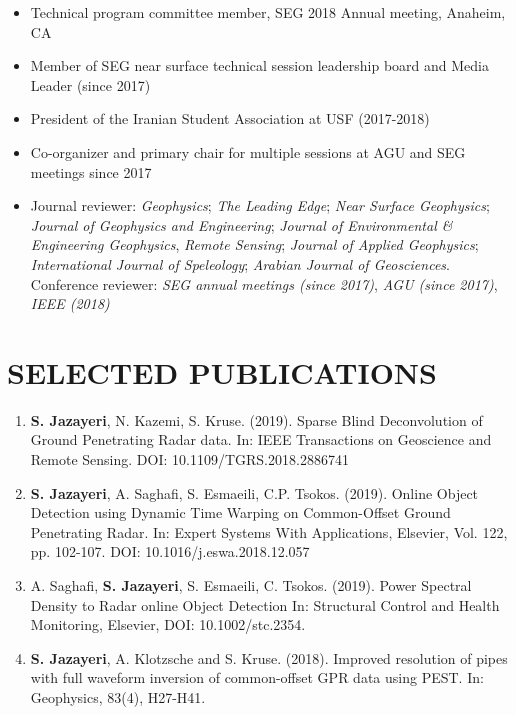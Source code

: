 \documentclass[11pt,a4paper,roman]{moderncv}        %
\begin{document}
{{{{{\begin{itemize}
	\item Technical program committee member, SEG 2018 Annual meeting, Anaheim, CA
	\item Member of SEG near surface technical session leadership board and Media Leader (since 2017) 
	\item President of the Iranian Student Association at USF (2017-2018)
	\item Co-organizer and primary chair for multiple sessions at AGU and SEG meetings since 2017
	\item Journal reviewer: \textit{Geophysics}; \textit{The Leading Edge}; \textit{Near Surface Geophysics}; \textit{Journal of Geophysics and Engineering}; \textit{Journal of Environmental \& Engineering Geophysics}, \textit{Remote Sensing}; \textit{Journal of Applied Geophysics}; \textit{International Journal of Speleology}; \textit{Arabian Journal of Geosciences}. Conference reviewer: \textit{SEG annual meetings (since 2017)}, \textit{AGU (since 2017)}, \textit{IEEE (2018)}
	
\end{itemize}

\vspace*{-1mm}
\section{SELECTED PUBLICATIONS}              
\begin{enumerate}
	\item \textbf{S. Jazayeri}, N. Kazemi, S. Kruse. (2019). Sparse Blind Deconvolution of Ground Penetrating Radar data. In: IEEE Transactions on Geoscience and Remote Sensing. DOI: 10.1109/TGRS.2018.2886741
	
	\item \textbf{S. Jazayeri}, A. Saghafi, S. Esmaeili, C.P. Tsokos. (2019). Online Object Detection using Dynamic Time Warping on Common-Offset Ground Penetrating Radar. In: Expert Systems With Applications, Elsevier, Vol. 122, pp. 102-107. DOI: 10.1016/j.eswa.2018.12.057 
	
	\item A. Saghafi, \textbf{S. Jazayeri}, S. Esmaeili, C. Tsokos. (2019). Power Spectral Density to Radar online Object Detection In: Structural Control and Health Monitoring, Elsevier, DOI: 10.1002/stc.2354.
	
	\item \textbf{S. Jazayeri}, A. Klotzsche and S. Kruse. (2018). Improved resolution of pipes with full waveform inversion of common-offset GPR data using PEST. In: Geophysics, 83(4), H27-H41. 
	

\end{enumerate}}}}}}
\end{document}
